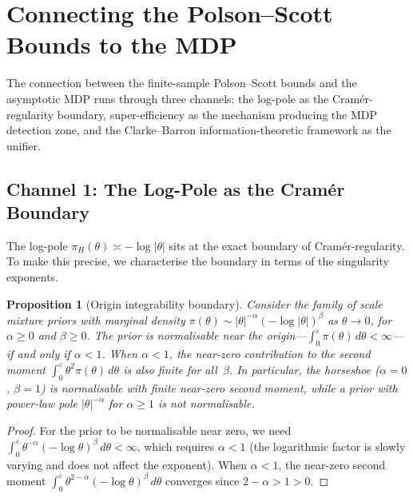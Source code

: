 \documentclass[12pt]{article}
\newtheorem{proposition}[theorem]{Proposition}
\newcommand{\abs}[1]{\lvert #1 \rvert}
\newcommand{\piH}{\pi_H}
\begin{document}
\section{Connecting the Polson--Scott Bounds to the MDP}\label{sec:connections}

The connection between the finite-sample Polson--Scott bounds and the asymptotic MDP runs through three channels: the log-pole as the Cram\'er-regularity boundary, super-efficiency as the mechanism producing the MDP detection zone, and the Clarke--Barron information-theoretic framework as the unifier.

\subsection{Channel 1: The Log-Pole as the Cram\'er Boundary}\label{sec:channel1}

The log-pole $\piH(\theta) \asymp -\log\abs{\theta}$ sits at the exact boundary of Cram\'er-regularity. To make this precise, we characterise the boundary in terms of the singularity exponents.

\begin{proposition}[Origin integrability boundary]\label{prop:cramer-boundary}
Consider the family of scale mixture priors with marginal density $\pi(\theta) \sim \abs{\theta}^{-\alpha}(-\log\abs{\theta})^\beta$ as $\theta \to 0$, for $\alpha \geq 0$ and $\beta \geq 0$. The prior is normalisable near the origin---$\int_0^\varepsilon \pi(\theta)\, d\theta < \infty$---if and only if $\alpha < 1$. When $\alpha < 1$, the near-zero contribution to the second moment $\int_0^\varepsilon \theta^2 \pi(\theta)\, d\theta$ is also finite for all~$\beta$. In particular, the horseshoe ($\alpha = 0$, $\beta = 1$) is normalisable with finite near-zero second moment, while a prior with power-law pole $\abs{\theta}^{-\alpha}$ for $\alpha \geq 1$ is not normalisable.
\end{proposition}

\begin{proof}
For the prior to be normalisable near zero, we need $\int_0^\varepsilon \theta^{-\alpha}(-\log\theta)^\beta\, d\theta < \infty$, which requires $\alpha < 1$ (the logarithmic factor is slowly varying and does not affect the exponent). When $\alpha < 1$, the near-zero second moment $\int_0^\varepsilon \theta^{2-\alpha}(-\log\theta)^\beta\, d\theta$ converges since $2 - \alpha > 1 > 0$.
\end{proof}
\end{document}
